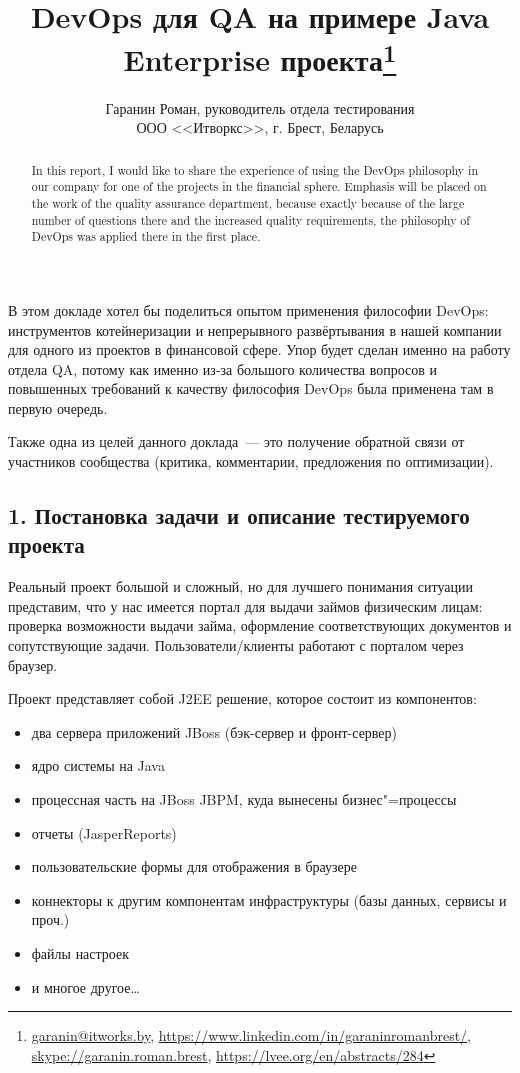 \documentclass[10pt, a5paper]{article}
\begin{document}
\title{DevOps для QA на примере Java Enterprise проекта\footnote{\url{garanin@itworks.by}, \url{https://www.linkedin.com/in/garaninromanbrest/}, \url{skype://garanin.roman.brest}, \url{https://lvee.org/en/abstracts/284}}}
\author{Гаранин Роман, руководитель отдела тестирования\\ ООО <<Итворкс>>, г. Брест, Беларусь}
\maketitle
\begin{abstract}
In this report, I would like to share the experience of using the DevOps philosophy in our company for one of the projects in the financial sphere. Emphasis will be placed on the work of the quality assurance department, because exactly because of the large number of questions there and the increased quality requirements, the philosophy of DevOps was applied there in the first place.
\end{abstract}
В этом докладе хотел бы поделиться опытом применения философии DevOps: инструментов котейнеризации и непрерывного развёртывания в нашей компании для одного из проектов в финансовой сфере. Упор будет сделан именно на работу отдела QA, потому как именно из-за большого количества вопросов и повышенных требований к качеству философия DevOps была применена там в первую очередь.

Также одна из целей данного доклада~--- это получение обратной связи от участников сообщества (критика, комментарии, предложения по оптимизации).

\subsection*{1. Постановка задачи и описание тестируемого проекта}

Реальный проект большой и сложный, но для лучшего понимания ситуации представим, что у нас имеется портал для  выдачи займов физическим лицам: проверка возможности выдачи займа, оформление соответствующих документов и сопутствующие задачи. Пользователи/клиенты работают с порталом через браузер.

Проект представляет собой J2EE решение, которое состоит из компонентов:

\begin{itemize}
  \item два сервера приложений JBoss (бэк-сервер и фронт-сервер)
  \item ядро системы на Java
  \item процессная часть на JBoss JBPM, куда вынесены бизнес"=процессы
  \item отчеты (JasperReports)
  \item пользовательские формы для отображения в браузере
  \item коннекторы к другим компонентам инфраструктуры (базы данных, сервисы и проч.)
  \item файлы настроек
  \item и многое другое\ldots{}
\end{itemize}
\end{document}
